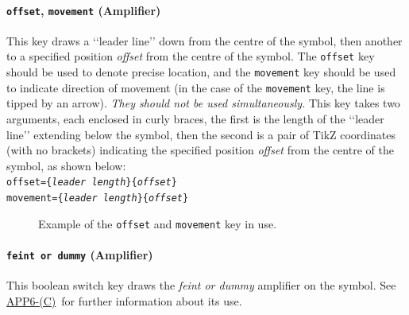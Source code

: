 \documentclass[a4paper, titlepage]{article}
\newcommand\DocLink{\href{https://web.archive.org/web/20150921231042/http://armawiki.zumorc.de/files/NATO/APP-6(C).pdf}{APP6-(C)}}
\begin{document}
\paragraph{\texttt{offset}, \texttt{movement} (Amplifier)}

This key draws a \lq\lq{}leader line\rq\rq{} down from the centre of the symbol, then another to a specified position \textit{offset} from the centre of the symbol. The \texttt{offset} key should be used to denote precise location, and the \texttt{movement} key should be used to indicate direction of movement (in the case of the \texttt{movement} key, the line is tipped by an arrow). \textit{They should not be used simultaneously.} This key takes two arguments, each enclosed in curly braces, the first is the length of the \lq\lq{}leader line\rq\rq{} extending below the symbol, then the second is a pair of TikZ coordinates (with no brackets) indicating the specified position \textit{offset} from the centre of the symbol, as shown below:\\

\texttt{offset=\{\textit{leader length}\}\{\textit{offset}\}}\\
\indent\texttt{movement=\{\textit{leader length}\}\{\textit{offset}\}}

\begin{figure}[H]
\centering
{}
\caption{Example of the \texttt{offset} and \texttt{movement}  key in use.}
\end{figure}

\paragraph{\texttt{feint or dummy} (Amplifier)}

This boolean switch key draws the \textit{feint or dummy} amplifier on the symbol. See \DocLink\ for further information about its use.
\end{document}
